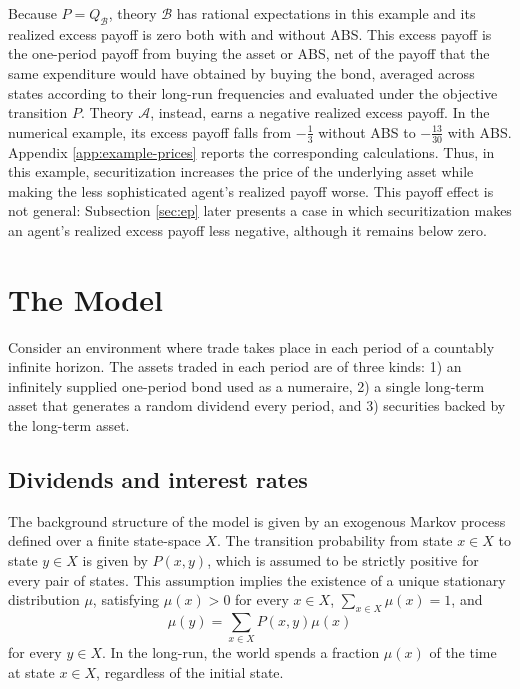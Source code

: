 \documentclass[11pt]{article}
\theoremstyle{plain}
\begin{document}
Because $P=Q_{\mathcal{B}}$, theory $\mathcal{B}$ has rational expectations in this example and its realized excess payoff is zero both with and without ABS. This excess payoff is the one-period payoff from buying the asset or ABS, net of the payoff that the same expenditure would have obtained by buying the bond, averaged across states according to their long-run frequencies and evaluated under the objective transition $P$. Theory $\mathcal{A}$, instead, earns a negative realized excess payoff. In the numerical example, its excess payoff falls from $-\frac{1}{3}$ without ABS to $-\frac{13}{30}$ with ABS. Appendix \ref{app:example-prices} reports the corresponding calculations. Thus, in this example, securitization increases the price of the underlying asset while making the less sophisticated agent's realized payoff worse. This payoff effect is not general: Subsection \ref{sec:ep} later presents a case in which securitization makes an agent's realized excess payoff less negative, although it remains below zero.

\section{The Model}\label{model}

Consider an environment where trade takes place in each period of a countably infinite horizon. The assets traded in each period are of three kinds: 1) an infinitely supplied one-period bond used as a numeraire, 2) a single long-term asset that generates a random dividend every period, and 3) securities backed by the long-term asset.

\subsection{Dividends and interest rates}

The background structure of the model is given by an exogenous Markov process defined over a finite state-space $X$. The transition probability from state $x\in X$ to state $y\in X$ is given by $P(x,y)$, which is assumed to be strictly positive for every pair of states. This assumption implies the existence of a unique stationary distribution $\mu$, satisfying $\mu(x)>0$ for every $x\in X$, $\sum_{x\in X}\mu(x)=1$, and
\begin{equation}\label{eq:mu}
\mu(y)=\sum_{x\in X}P(x,y)\mu(x)
\end{equation}
for every $y\in X$. In the long-run, the world spends a fraction $\mu(x)$ of the time at state $x\in X$, regardless of the initial state.
\end{document}
